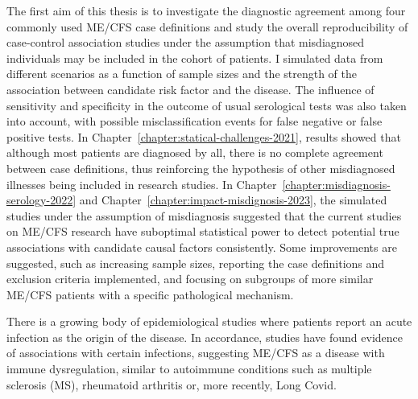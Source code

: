The first aim of this thesis is to investigate the diagnostic agreement among four commonly used ME/CFS case definitions and study the overall reproducibility of case-control association studies under the assumption that misdiagnosed individuals may be included in the cohort of patients. I simulated data from different scenarios as a function of sample sizes and the strength of the association between candidate risk factor and the disease. The influence of sensitivity and specificity in the outcome of usual serological tests was also taken into account, with possible misclassification events for false negative or false positive tests. In Chapter~\ref{chapter:statical-challenges-2021}, results showed that although most patients are diagnosed by all, there is no complete agreement between case definitions, thus reinforcing the hypothesis of other misdiagnosed illnesses being included in research studies. In Chapter~\ref{chapter:misdiagnosis-serology-2022} and Chapter~\ref{chapter:impact-misdignosis-2023}, the simulated studies under the assumption of misdiagnosis suggested that the current studies on ME/CFS research have suboptimal statistical power to detect potential true associations with candidate causal factors consistently. Some improvements are suggested, such as increasing sample sizes, reporting the case definitions and exclusion criteria implemented, and focusing on subgroups of more similar ME/CFS patients with a specific pathological mechanism.


There is a growing body of epidemiological studies where patients report an acute infection as the origin of the disease.
In accordance, studies have found evidence of associations with certain infections, suggesting ME/CFS as a disease with immune dysregulation, similar to autoimmune conditions such as multiple sclerosis (MS), rheumatoid arthritis or, more recently, Long Covid.

